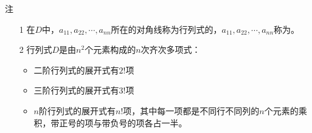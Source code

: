 \begin{frame}

  \begin{block}{注}
    \begin{enumerate}
    \item[1]
      在$D$中，$a_{11},a_{22},\cdots,a_{nn}$所在的对角线称为行列式的，$a_{11},a_{22},\cdots,a_{nn}$称为。\\[0.1in]
    \item[2]
      行列式$D$是由$n^2$个元素构成的$n$次齐次多项式：\\[0.1in]
      \begin{itemize}
      \item 二阶行列式的展开式有$2!$项 \\[0.1in]
      \item 三阶行列式的展开式有$3!$项 \\[0.1in]
      \item $n$阶行列式的展开式有$n!$项，其中每一项都是不同行不同列的$n$个元素的乘积，带正号的项与带负号的项各占一半。
      \end{itemize}

    \end{enumerate}
    
  \end{block}
\end{frame}


